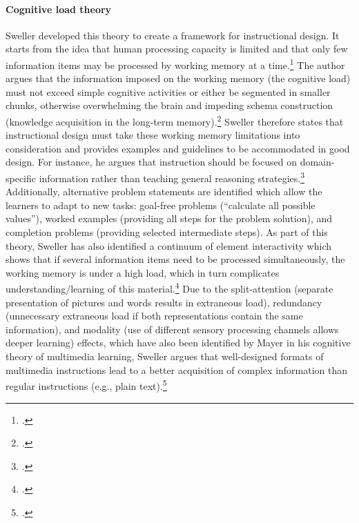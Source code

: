 \paragraph{Cognitive load theory} Sweller developed this theory to create a framework for instructional design. It starts from the idea that human processing capacity is limited and that only few information items may be processed by working memory at a time.\footcites[Cf.][p.250]{SwellerCognitiveArchitectureInstructional1998}[cf.][p.490]{Gervenefficiencymultimedialearning2003} The author argues that the information imposed on the working memory (the cognitive load) must not exceed simple cognitive activities or either be segmented in smaller chunks, otherwise overwhelming the brain and impeding schema construction (knowledge acquisition in the long-term memory).\footcites[Cf.][pp.255 et seq]{SwellerCognitiveArchitectureInstructional1998}[cf.][p.2]{SwellerVisualisationInstructionalDesign2002}[cf.][p.562]{Gervenefficiencymultimedialearning2003} Sweller therefore states that instructional design must take these working memory limitations into consideration and provides examples and guidelines to be accommodated in good design. For instance, he argues that instruction should be focused on domain-specific information rather than teaching general reasoning strategies.\footcites[Cf.][p.255]{SwellerCognitiveArchitectureInstructional1998}[cf.][p.301]{SwellerCognitiveloadtheory1994} Additionally, alternative problem statements are identified which allow the learners to adapt to new tasks: goal-free problems (\enquote{calculate all possible values}), worked examples (providing all steps for the problem solution), and completion problems (providing selected intermediate steps).
As part of this theory, Sweller has also identified a continuum of element interactivity which shows that if several information items need to be processed simultaneously, the working memory is under a high load, which in turn complicates understanding/learning of this material.\footcites[Cf.][p.261]{SwellerCognitiveArchitectureInstructional1998} Due to the split-attention (separate presentation of pictures and words results in extraneous load), redundancy (unnecessary extraneous load if both representations contain the same information), and modality (use of different sensory processing channels allows deeper learning) effects, which have also been identified by Mayer in his cognitive theory of multimedia learning, Sweller argues that well-designed formats of multimedia instructions lead to a better acquisition of complex information than regular instructions (e.g., plain text).\footcites[Cf.][p.4]{PaasCognitiveLoadTheory2004}

